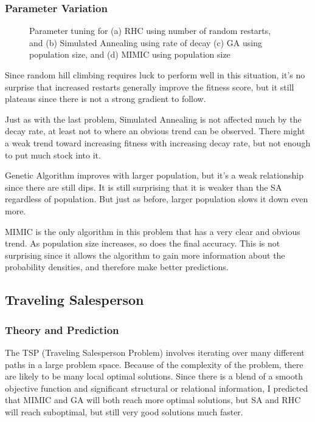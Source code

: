 \documentclass[
	letterpaper, %
]{mlreport}
\begin{document}
\subsubsection{Parameter Variation}
\begin{figure}
	\centering
	\caption{Parameter tuning for (a) RHC using number of random restarts, and (b) Simulated Annealing using rate of decay (c) GA using population size, and (d) MIMIC using population size}
	\label{fig:fig4}
\end{figure}
Since random hill climbing requires luck to perform well in this situation, it's no surprise that increased restarts generally improve the fitness score, but it still plateaus since there is not a strong gradient to follow.

Just as with the last problem, Simulated Annealing is not affected much by the decay rate, at least not to where an obvious trend can be observed. There might a weak trend toward increasing fitness with increasing decay rate, but not enough to put much stock into it.

Genetic Algorithm improves with larger population, but it's a weak relationship since there are still dips. It is still surprising that it is weaker than the SA regardless of population. But just as before, larger population slows it down even more.

MIMIC is the only algorithm in this problem that has a very clear and obvious trend. As population size increases, so does the final accuracy. This is not surprising since it allows the algorithm to gain more information about the probability densities, and therefore make better predictions.

\subsection{Traveling Salesperson}
\subsubsection{Theory and Prediction}
The TSP (Traveling Salesperson Problem) involves iterating over many different paths in a large problem space. Because of the complexity of the problem, there are likely to be many local optimal solutions. Since there is a blend of a smooth objective function and significant structural or relational information, I predicted that MIMIC and GA will both reach more optimal solutions, but SA and RHC will reach suboptimal, but still very good solutions much faster.
\end{document}
